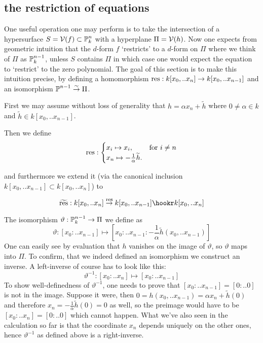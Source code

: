 \subsection{the restriction of equations}


One useful operation one may perform is to take the intersection of a hypersurface $S = \operatorname{\mathcal V}(f) \subset \operatorname{\mathbb P}^n_k$ with a hyperplane $\Pi = \operatorname{\mathcal V}(h)$. Now one expects from geometric intuition that the $d$-form $f$ `restricts' to a $d$-form on $\Pi$ where we think of $\Pi$ as $\operatorname{\mathbb P}^{n-1}_k$, unless $S$ contains $\Pi$ in which case one would expect the equation to `restrict' to the zero polynomial.
The goal of this section is to make this intuition precise, by defining a homomorphism ${\operatorname{res}} : k[x_0,..x_n] \to k[x_0,..x_{n-1}]$ and an isomorphism $\operatorname{\mathbb P}^{n-1} \overset\sim\to \Pi$.

First we may assume without loss of generality that
$h = \alpha x_n + \widetilde h$ where $0 \neq \alpha \in k$ and $\widetilde h \in k[x_0,..x_{n-1}]$.

Then we define
\begin{equation}
{\operatorname{res}} : \begin{cases}
x_i \mapsto x_i, & \text{for } i \neq n \\
x_n \mapsto -\frac 1\alpha \widetilde h. &
\end{cases}
\end{equation}

and furthermore we extend it (via the canonical inclusion $k[x_0,..x_{n-1}] \subset k[x_0,..x_n]$) to

\begin{equation}
\widetilde{\var{res}} : k[x_0,.. x_n] \overset{\var{res}}\to k[x_0,.. x_{n-1}] \hookr k[x_0,.. x_n]
\end{equation}

The isomorphism $\vartheta : \operatorname{\mathbb P}^{n-1}_k \to \Pi$ we define as
\begin{equation}
\vartheta : [x_0:..x_{n-1}] \mapsto [x_0:..x_{n-1}:-\frac 1\alpha \widetilde h(x_0,..x_{n-1})]
\end{equation}
One can easily see by evaluation that $h$ vanishes on the image of $\vartheta$, so $\vartheta$ maps into $\Pi$. To confirm, that we indeed defined an isomorphism we construct an inverse.
A left-inverse of course has to look like this:
\begin{equation}
\vartheta^{-1} : [x_0:..x_n] \mapsto [x_0:..x_{n-1}]
\end{equation}
To show well-definedness of $\vartheta^{-1}$, one needs to prove that $[x_0:..x_{n-1}] = [0:..0]$ is not in the image. Suppose it were, then $0 = h(x_0,..x_{n-1}) = \alpha x_n + \widetilde h(0)$ and therefore $x_n = -\frac 1\alpha \widetilde h(0) = 0$ as well, so the preimage would have to be $[x_0:..x_n] = [0:..0]$ which cannot happen.
What we've also seen in the calculation so far is that the coordinate $x_n$ depends uniquely on the other ones, hence $\vartheta^{-1}$ as defined above is a right-inverse.

